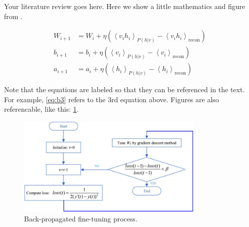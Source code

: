 Your literature review goes here. Here we show a little mathematics and figure from \cite{baek2019}.

\begin{align} 
    {W_{i + 1}} &= {W_i} + \eta ({\left\langle {{v_i}{h_i}} \right\rangle _{P(h\left| v \right.)}} - {\left\langle {{v_i}{h_i}} \right\rangle _{{\text{recon}}}})\label{eq:b1}\\ 
    {b_{i + 1}} &= {b_i} + \eta ({\left\langle {{v_i}} \right\rangle _{P(h\left| v \right.)}} - {\left\langle {{v_i}} \right\rangle _{{\text{recon}}}})\label{eq:b2}\\ 
    {a_{i + 1}} &= {a_i} + \eta ({\left\langle {{h_i}} \right\rangle _{P(h\left| v \right.)}} - {\left\langle {{h_i}} \right\rangle _{{\text{recon}}}})\label{eq:b3} 
\end{align} 

Note that the equations are labeled so that they can be referenced in the text.  For example, \ref{eq:b3} refers to the 3rd equation above.  Figures are also referencable, like this: \ref{fig:example}.

\begin{figure}
    \includegraphics[width=0.8\textwidth]{baek4-2880511-large.jpg}
    \caption{Back-propagated fine-tuning process. \cite{baek2019}}
    \label{fig:example}
\end{figure}